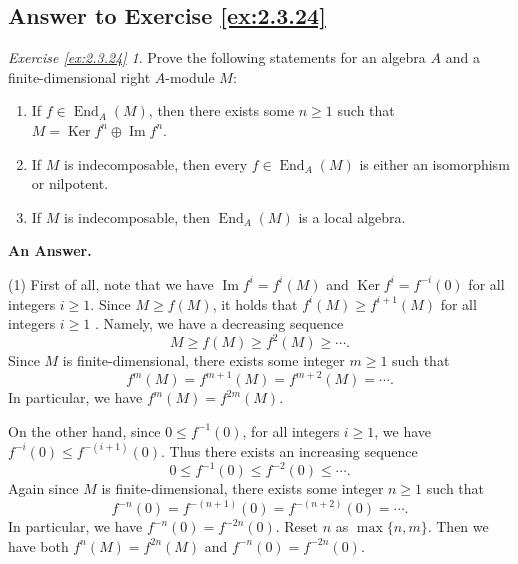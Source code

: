 \documentclass{surv-l}
\numberwithin{equation}{chapter}
\numberwithin{figure}{chapter}
\theoremstyle{plain}
\theoremstyle{definition}
\theoremstyle{remark}
\DeclareMathOperator{\Ker}{Ker}
\DeclareMathOperator{\End}{End}
\begin{document}
\subsection{Answer to Exercise \protect\ref{ex:2.3.24}}\label{sec:exc2.3.24}
\newtheorem*{exc24}{Exercise \ref{ex:2.3.24}}
\begin{exc24}
Prove the following statements
for an algebra $A$ and a finite-dimensional right $A$-module $M$:
\begin{enumerate}
\item
If $f \in \End_A(M)$, then there exists some $n \ge 1$ such that
$M = \Ker f^n \oplus \operatorname{Im} f^n$.
\item
If $M$ is indecomposable, then every $f \in \End_A(M)$
is either an isomorphism or nilpotent.
\item
If $M$ is indecomposable, then $\End_A(M)$ is a local algebra.
\end{enumerate}
\end{exc24}

{\bf An Answer.}

(1) First of all, note that we have
$\operatorname{Im} f^i = f^i(M)$ and $\Ker f^i = f^{-i}(0)$ for all integers $i \ge 1$.
Since $M \ge f(M)$, it holds that $f^{i}(M) \ge f^{i+1}(M)$
for all integers $i \ge 1$ .
Namely, we have a decreasing sequence
\begin{equation}\label{eq:dc}
M \ge f(M) \ge f^2(M) \ge \cdots.
\end{equation}
Since $M$ is finite-dimensional, there exists some integer $m \ge 1$
such that
\begin{equation*}
f^m(M) = f^{m+1}(M) = f^{m+2}(M) = \cdots.
\end{equation*}
In particular, we have $f^m(M) = f^{2m}(M)$.

On the other hand, since $0 \le f^{-1} (0)$, for all integers $i \ge 1$, we have
$f^{-i}(0) \le f^{-(i+1)}(0)$.
Thus there exists an increasing sequence
\begin{equation}\label{eq:ac}
0 \le f^{-1}(0) \le f^{-2}(0) \le \cdots.
\end{equation}
Again since $M$ is finite-dimensional, there exists some integer $n \ge 1$
such that
\begin{equation*}
f^{-n}(0) = f^{-(n+1)}(0) = f^{-(n+2)}(0) = \cdots.
\end{equation*}
In particular, we have $f^{-n}(0) = f^{-2n}(0)$.
Reset $n$ as $\max\{n, m\}$.
Then we have both
$f^n(M) = f^{2n}(M)$ and $f^{-n}(0) = f^{-2n}(0)$.
\end{document}
